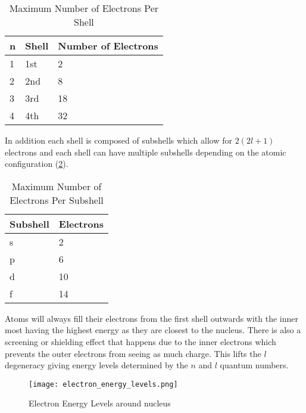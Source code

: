 \documentclass[jon_ringuette_thesis.tex]{subfiles}
\begin{document}
    \begin{table}
        \centering
        \caption{Maximum Number of Electrons Per Shell}
        \label{mine}
        \begin{tabular}{|l|l|l|}
            \hline
            n & Shell & Number of Electrons \\
            \hline
            1 & 1st   & 2                   \\
            \hline
            2 & 2nd   & 8                   \\
            \hline
            3 & 3rd   & 18                  \\
            \hline
            4 & 4th   & 32                  \\
            \hline
        \end{tabular}
        \label{tab:atomic_shell}
    \end{table}



    In addition each shell is composed of subshells which allow for $2(2l+1)$ electrons and each shell can have multiple subshells depending on the atomic configuration (\ref{tab:atomic_subshell}).
    \begin{table}
        \centering
        \caption{Maximum Number of Electrons Per Subshell}
        \label{mine}
        \begin{tabular}{|l|l|}
            \hline
            Subshell & Electrons \\
            \hline
            s        & 2         \\
            \hline
            p        & 6         \\
            \hline
            d        & 10        \\
            \hline
            f        & 14        \\
            \hline
        \end{tabular}
        \label{tab:atomic_subshell}
    \end{table}

    Atoms will always fill their electrons from the first shell outwards with the inner most having the highest energy as they are closest to the nucleus.
    There is also a screening or shielding effect that happens due to the inner electrons which prevents the outer electrons from seeing as much charge. This lifts the $l$ degeneracy giving energy levels determined by the $n$ and $l$ quantum numbers.

    \begin{figure}[H]
        \begin{center}
            \texttt{[image: electron\_energy\_levels.png]}
        \end{center}
        \caption{Electron Energy Levels around nucleus}
        \label{fig:atomic_energy_levels}
    \end{figure}
\end{document}
